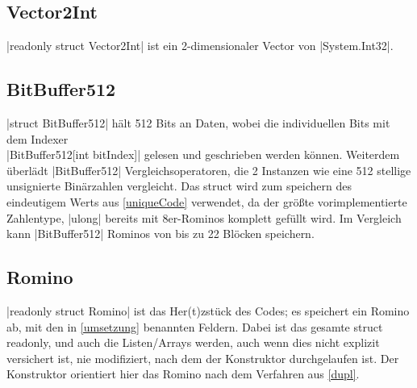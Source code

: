 \documentclass[a4paper,10pt,ngerman]{scrartcl}
\begin{document}
\subsection{Vector2Int}

|readonly struct Vector2Int| ist ein 2-dimensionaler Vector von
|System.Int32|.

\subsection{BitBuffer512}

|struct BitBuffer512| hält 512 Bits an Daten,
wobei die individuellen Bits mit dem Indexer\\
|BitBuffer512[int bitIndex]| gelesen und geschrieben
werden können. Weiterdem überlädt |BitBuffer512|
Vergleichsoperatoren, die 2 Instanzen wie eine 512 stellige
unsignierte Binärzahlen vergleicht.
Das struct wird zum speichern des eindeutigem Werts aus
\cref{uniqueCode} verwendet, da der größte vorimplementierte
Zahlentype, |ulong| bereits mit 8er-Rominos komplett
gefüllt wird. Im Vergleich kann |BitBuffer512|
Rominos von bis zu 22 Blöcken speichern.

\subsection{Romino}

|readonly struct Romino| ist das Her(t)zstück des Codes; es speichert ein Romino ab,
mit den in \cref{umsetzung} benannten Feldern. Dabei ist das gesamte struct
readonly, und auch die Listen/Arrays werden, auch wenn dies nicht explizit
versichert ist, nie modifiziert, nach dem der Konstruktor durchgelaufen ist.
Der Konstruktor orientiert hier das Romino nach dem Verfahren aus \cref{dupl}.
\end{document}
